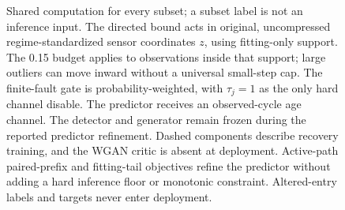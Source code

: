 \begin{figure}[!t]
\caption{Shared computation for every subset; a subset label is not an inference input. The directed bound acts in original, uncompressed regime-standardized sensor coordinates $z$, using fitting-only support. The 0.15 budget applies to observations inside that support; large outliers can move inward without a universal small-step cap. The finite-fault gate is probability-weighted, with $\tau_j=1$ as the only hard channel disable. The predictor receives an observed-cycle age channel. The detector and generator remain frozen during the reported predictor refinement. Dashed components describe recovery training, and the WGAN critic is absent at deployment. Active-path paired-prefix and fitting-tail objectives refine the predictor without adding a hard inference floor or monotonic constraint. Altered-entry labels and targets never enter deployment.}
\label{fig:architecture}
\end{figure}
